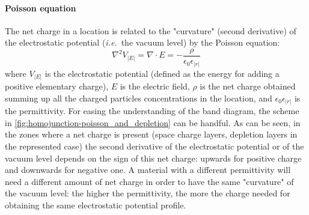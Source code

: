 		\paragraph{Poisson equation}
		The net charge in a location is related to the "curvature" (second derivative) of the electrostatic potential (\textsl{i.e.}\ the vacuum level) by the Poisson equation:
		\begin{equation}
			\nabla^2 V_|E| = \nabla \cdot E = -\frac{\rho}{\epsilon_0 \epsilon_|r|}
		\end{equation}
		where $V_|E|$ is the electrostatic potential (defined as the energy for adding a positive elementary charge), $E$ is the electric field, $\rho$ is the net charge obtained summing up all the charged particles concentrations in the location, and $\epsilon_0 \epsilon_|r|$ is the permittivity.
		For easing the understanding of the band diagram, the scheme in \cref{fig:homojunction-poisson_and_depletion} can be handful.
		As can be seen, in the zones where a net charge is present (space charge layers, depletion layers in the represented case) the second derivative of the electrostatic potential or of the vacuum level depends on the sign of this net charge: upwards for positive charge and downwards for negative one.
		A material with a different permittivity will need a different amount of net charge in order to have the same "curvature" of the vacuum level: the higher the permittivity, the more the charge needed for obtaining the same electrostatic potential profile.
	
